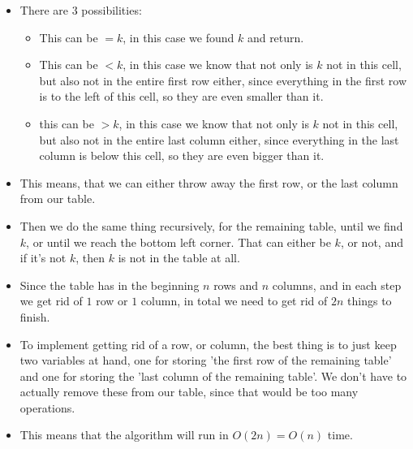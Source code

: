 \begin{itemize}
    \item There are $3$ possibilities:
    \begin{itemize}
        \item This can be $=k$, in this case we found $k$ and return.
        \item This can be $<k$, in this case we know that not only is $k$ not in this cell, but also not in the entire first row either, since everything in the first row is to the left of this cell, so they are even smaller than it.
        \item this can be $>k$, in this case we know that not only is $k$ not in this cell, but also not in the entire last column either, since everything in the last column is below this cell, so they are even bigger than it.
    \end{itemize}
    \item This means, that we can either throw away the first row, or the last column from our table.
    \item Then we do the same thing recursively, for the remaining table, until we find $k$, or until we reach the bottom left corner. That can either be $k$, or not, and if it's not $k$, then $k$ is not in the table at all.
    \item Since the table has in the beginning $n$ rows and $n$ columns, and in each step we get rid of $1$ row or $1$ column, in total we need to get rid of $2n$ things to finish.
    \item To implement getting rid of a row, or column, the best thing is to just keep two variables at hand, one for storing 'the first row of the remaining table' and one for storing the 'last column of the remaining table'. We don't have to actually remove these from our table, since that would be too many operations.
    \item This means that the algorithm will run in $O(2n) = O(n)$ time.
\end{itemize}